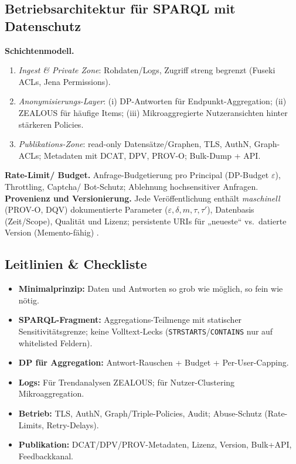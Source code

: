 \subsection{Betriebsarchitektur für SPARQL mit Datenschutz}
\label{sec:privacy-governance}
\textbf{Schichtenmodell.}
\begin{enumerate}
  \item \emph{Ingest \& Private Zone}: Rohdaten/Logs, Zugriff streng begrenzt (Fuseki ACLs, Jena Permissions).
  \item \emph{Anonymisierungs-Layer}: (i) DP-Antworten für Endpunkt-Aggregation; (ii) ZEALOUS für häufige Items; (iii) Mikroaggregierte Nutzeransichten hinter stärkeren Policies.
  \item \emph{Publikations-Zone}: read-only Datensätze/Graphen, TLS, AuthN, Graph-ACLs; Metadaten mit DCAT, DPV, PROV-O; Bulk-Dump + API.
\end{enumerate}
\textbf{Rate-Limit/ Budget.} Anfrage-Budgetierung pro Principal (DP-Budget $\varepsilon$), Throttling, Captcha/ Bot-Schutz; Ablehnung hochsensitiver Anfragen. 
\textbf{Provenienz und Versionierung.} Jede Veröffentlichung enthält \emph{maschinell} (PROV-O, DQV) dokumentierte Parameter ($\varepsilon,\delta,m,\tau,\tau'$), Datenbasis (Zeit/Scope), Qualität und Lizenz; persistente URIs für „neueste“ vs.\ datierte Version (Memento-fähig) \cite{W3CDWBP}.

\subsection{Leitlinien \& Checkliste}
\begin{itemize}
  \item \textbf{Minimalprinzip:} Daten und Antworten so grob wie möglich, so fein wie nötig.
  \item \textbf{SPARQL-Fragment:} Aggregations-Teilmenge mit statischer Sensitivitätsgrenze; keine Volltext-Lecks (\texttt{STRSTARTS}/\texttt{CONTAINS} nur auf whitelisted Feldern).
  \item \textbf{DP für Aggregation:} Antwort-Rauschen + Budget + Per-User-Capping.
  \item \textbf{Logs:} Für Trendanalysen ZEALOUS; für Nutzer-Clustering Mikroaggregation.
  \item \textbf{Betrieb:} TLS, AuthN, Graph/Triple-Policies, Audit; Abuse-Schutz (Rate-Limits, Retry-Delays).
  \item \textbf{Publikation:} DCAT/DPV/PROV-Metadaten, Lizenz, Version, Bulk+API, Feedbackkanal.
\end{itemize}

